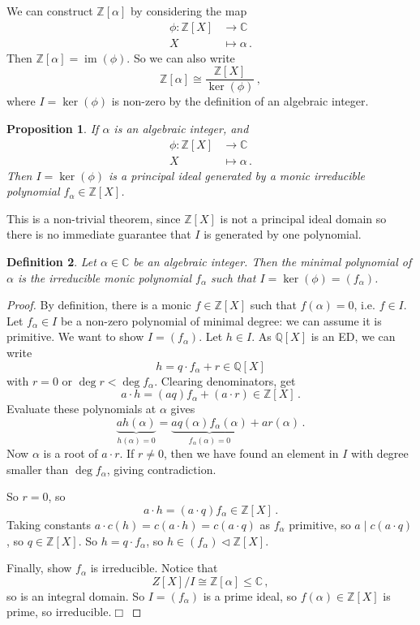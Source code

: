 \documentclass{article}
\theoremstyle{plain}\theoremheaderfont{\normalfont\itshape}\theorembodyfont{\rmfamily}\theoremseparator{.}\newtheorem*{rem}{Remark}\newtheorem*{ex}{Example}\newtheorem*{proof}{Proof}\newtheorem*{altp}{Alternative proof}\newtheorem*{nonex}{Non-Example}
\theoremstyle{plain}\theoremheaderfont{\normalfont\bfseries}\theorembodyfont{\rmfamily}\theoremseparator{.}\newtheorem{thm}{Theorem}[section]\newtheorem{lem}[thm]{Lemma}\newtheorem{prop}[thm]{Proposition}\newtheorem*{cor}{Corollary}\newtheorem{defn}[thm]{Definition}\newtheorem{clm}[thm]{Claim}\newtheorem{clminproof}{Claim}\newtheorem*{notn}{Notation}\newtheorem*{exer}{Exercise}\newtheorem*{lemnn}{Lemma}
\theoremstyle{break}\theoremheaderfont{\normalfont\itshape}\theorembodyfont{\rmfamily}\theoremseparator{.\medskip}\newtheorem*{proofskip}{Proof}\newtheorem*{exs}{Examples}\newtheorem*{rems}{Remarks}\newtheorem*{obs}{Observations}
\theoremstyle{break}\theoremheaderfont{\normalfont\bfseries}\theorembodyfont{\rmfamily}\theoremseparator{.\medskip}\newtheorem{lemskip}[thm]{Lemma}\newtheorem{defnskip}[thm]{Definition}\newtheorem{propskip}[thm]{Proposition}\newtheorem{thmskip}[thm]{Theorem}
\numberwithin{equation}{section}
\newcommand{\qed}{\hfill\ensuremath{\Box}}
\DeclareMathOperator*{\im}{im}
\newcommand{\ZZ}{\mathbb{Z}}
\newcommand{\QQ}{\mathbb{Q}}
\newcommand{\CC}{\mathbb{C}}
\begin{document}
    We can construct \(\ZZ[\alpha]\) by considering the map
    \begin{align*}
        \phi:\ZZ[X]&\longrightarrow\CC\\
        X&\longmapsto\alpha\,.
    \end{align*}
    Then \(\ZZ[\alpha]=\im(\phi)\). So we can also write
    \[\ZZ[\alpha]\cong\frac{\ZZ[X]}{\ker(\phi)}\,,\]
    where \(I=\ker(\phi)\) is non-zero by the definition of an algebraic integer.
    \begin{prop}
        If \(\alpha\) is an algebraic integer, and
        \begin{align*}
            \phi:\ZZ[X]&\longrightarrow\CC\\
            X&\longmapsto\alpha\,.
        \end{align*}
        Then \(I=\ker(\phi)\) is a principal ideal generated by a monic irreducible polynomial \(f_\alpha\in\ZZ[X]\).
    \end{prop}
    This is a non-trivial theorem, since \(\ZZ[X]\) is not a principal ideal domain so there is no immediate guarantee that \(I\) is generated by one polynomial.
    \begin{defn}
        Let \(\alpha\in\CC\) be an algebraic integer. Then the minimal polynomial of \(\alpha\) is the irreducible monic polynomial \(f_\alpha\) such that \(I=\ker(\phi)=(f_\alpha)\).
    \end{defn}
    \begin{proof}
        By definition, there is a monic \(f\in\ZZ[X]\) such that \(f(\alpha)=0\), i.e. \(f\in I\). Let \(f_\alpha\in I\) be a non-zero polynomial of minimal degree: we can assume it is primitive. We want to show \(I=(f_\alpha)\). Let \(h\in I\). As \(\QQ[X]\) is an ED, we can write
        \[h=q\cdot f_\alpha+r\in\QQ[X]\]
        with \(r=0\) or \(\deg r<\deg f_\alpha\). Clearing denominators, get
        \[a\cdot h=(aq)f_\alpha+(a\cdot r)\in\ZZ[X]\,.\]
        Evaluate these polynomials at \(\alpha\) gives
        \[\underbrace{ah(\alpha)}_{h(\alpha)=0}=\underbrace{aq(\alpha)f_\alpha(\alpha)}_{f_\alpha(\alpha)=0}+ar(\alpha)\,.\]
        Now \(\alpha\) is a root of \(a\cdot r\). If \(r\ne 0\), then we have found an element in \(I\) with degree smaller than \(\deg f_\alpha\), giving contradiction.

        So \(r=0\), so
        \[a\cdot h=(a\cdot q)f_\alpha\in\ZZ[X]\,.\]
        Taking constants \(a\cdot c(h)=c(a\cdot h)=c(a\cdot q)\) as \(f_\alpha\) primitive, so \(a\mid c(a\cdot q)\), so \(q\in\ZZ[X]\). So \(h=q\cdot f_\alpha\), so \(h\in(f_\alpha)\lhd\ZZ[X]\).

        Finally, show \(f_\alpha\) is irreducible. Notice that
        \[Z[X]/I\cong\ZZ[\alpha]\le\CC\,,\]
        so is an integral domain. So \(I=(f_\alpha)\) is a prime ideal, so \(f(\alpha)\in\ZZ[X]\) is prime, so irreducible.\qed
    \end{proof}
\end{document}
